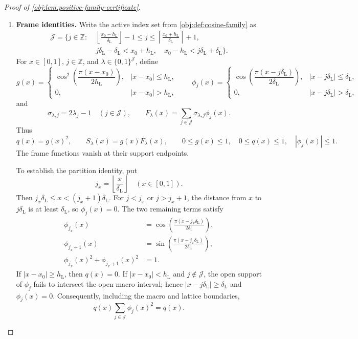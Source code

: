 \begin{proof}[Proof of \cref{obj:lem:positive-family-certificate}]
\begin{enumerate}
\item \textbf{Frame identities.}
Write the active index set from \cref{obj:def:cosine-family} as
\[
\begin{split}
\mathcal J=\biggl\{j\in\mathbb Z:\;&
\left\lfloor\frac{x_0-h_{\mathrm L}}{\delta_{\mathrm L}}\right\rfloor-1
\le j\le
\left\lceil\frac{x_0+h_{\mathrm L}}{\delta_{\mathrm L}}\right\rceil+1,\\
&j\delta_{\mathrm L}-\delta_{\mathrm L}<x_0+h_{\mathrm L},
\quad
x_0-h_{\mathrm L}<j\delta_{\mathrm L}+\delta_{\mathrm L}
\biggr\}.
\end{split}
\]
For \(x\in[0,1]\), \(j\in\mathbb Z\), and
\(\lambda\in\{0,1\}^{\mathcal J}\), define
\[
g(x)=
\begin{cases}
\cos^2\!\left(\dfrac{\pi(x-x_0)}{2h_{\mathrm L}}\right),
 & |x-x_0|\le h_{\mathrm L},\\
0,& |x-x_0|>h_{\mathrm L},
\end{cases}
\qquad
\phi_j(x)=
\begin{cases}
\cos\!\left(\dfrac{\pi(x-j\delta_{\mathrm L})}{2\delta_{\mathrm L}}\right),
 & |x-j\delta_{\mathrm L}|\le\delta_{\mathrm L},\\
0,& |x-j\delta_{\mathrm L}|>\delta_{\mathrm L},
\end{cases}
\]
and
\[
\sigma_{\lambda,j}=2\lambda_j-1\quad(j\in\mathcal J),
\qquad
F_\lambda(x)=\sum_{j\in\mathcal J}\sigma_{\lambda,j}\phi_j(x).
\]
Thus
\[
q(x)=g(x)^2,\qquad S_\lambda(x)=g(x)F_\lambda(x),
\qquad
0\le g(x)\le1,\quad 0\le q(x)\le1,\quad |\phi_j(x)|\le1.
\]
The frame functions vanish at their support endpoints.

To establish the partition identity, put
\[
j_x=\left\lfloor\frac{x}{\delta_{\mathrm L}}\right\rfloor
\quad(x\in[0,1]).
\]
Then \(j_x\delta_{\mathrm L}\le x<(j_x+1)\delta_{\mathrm L}\).
For \(j<j_x\) or \(j>j_x+1\), the distance from \(x\) to
\(j\delta_{\mathrm L}\) is at least \(\delta_{\mathrm L}\), so
\(\phi_j(x)=0\). The two remaining terms satisfy
\[
\begin{aligned}
\phi_{j_x}(x)
 &=\cos\!\left(\frac{\pi(x-j_x\delta_{\mathrm L})}
                         {2\delta_{\mathrm L}}\right),\\
\phi_{j_x+1}(x)
 &=\sin\!\left(\frac{\pi(x-j_x\delta_{\mathrm L})}
                         {2\delta_{\mathrm L}}\right),\\
\phi_{j_x}(x)^2+\phi_{j_x+1}(x)^2&=1.
\end{aligned}
\]
If \(|x-x_0|\ge h_{\mathrm L}\), then \(q(x)=0\).
If \(|x-x_0|<h_{\mathrm L}\) and \(j\notin\mathcal J\), the
open support of \(\phi_j\) fails to intersect the open macro interval;
hence \(|x-j\delta_{\mathrm L}|\ge\delta_{\mathrm L}\) and
\(\phi_j(x)=0\). Consequently, including the macro and lattice
boundaries,
\[
q(x)\sum_{j\in\mathcal J}\phi_j(x)^2=q(x).
\]


\end{enumerate}
\end{proof}
